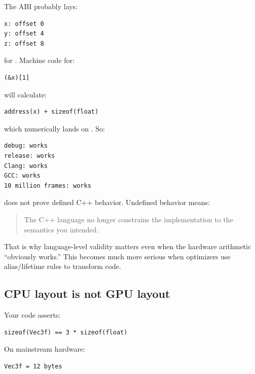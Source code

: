 \hypertarget{01-foundations-i-ch003-why-the-bug-often-appears-to-work-forever}{}

The ABI probably lays:

\begin{verbatim}
x: offset 0
y: offset 4
z: offset 8
\end{verbatim}

for . Machine code for:

\begin{verbatim}
(&x)[1]
\end{verbatim}

will calculate:

\begin{verbatim}
address(x) + sizeof(float)
\end{verbatim}

which numerically lands on . So:

\begin{verbatim}
debug: works
release: works
Clang: works
GCC: works
10 million frames: works
\end{verbatim}

does not prove defined C++ behavior. Undefined behavior means:

\begin{quote}
The C++ language no longer constrains the implementation to the semantics you intended.
\end{quote}

That is why language-level validity matters even when the hardware arithmetic ``obviously works.'' This becomes much more serious when optimizers use alias/lifetime rules to transform code.

\subsection{CPU layout is not GPU layout}\label{01-foundations-i-ch003-cpu-layout-is-not-gpu-layout}

\hypertarget{01-foundations-i-ch003-cpu-layout-is-not-gpu-layout}{}

Your code asserts:

\begin{verbatim}
sizeof(Vec3f) == 3 * sizeof(float)
\end{verbatim}

On mainstream hardware:

\begin{verbatim}
Vec3f = 12 bytes
\end{verbatim}

